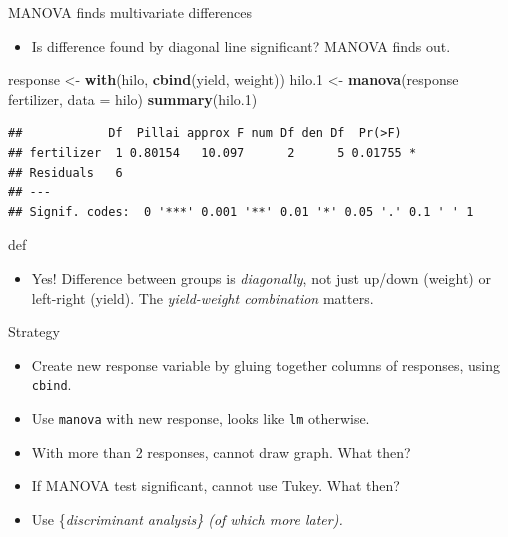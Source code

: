 \documentclass[ignorenonframetext,]{beamer}
\newenvironment{Shaded}{\begin{snugshade}}{\end{snugshade}}
\newcommand{\DataTypeTok}[1]{\textcolor[rgb]{0.13,0.29,0.53}{#1}}
\newcommand{\FloatTok}[1]{\textcolor[rgb]{0.00,0.00,0.81}{#1}}
\newcommand{\KeywordTok}[1]{\textcolor[rgb]{0.13,0.29,0.53}{\textbf{#1}}}
\newcommand{\NormalTok}[1]{#1}
\newcommand{\OperatorTok}[1]{\textcolor[rgb]{0.81,0.36,0.00}{\textbf{#1}}}
\newcommand{\StringTok}[1]{\textcolor[rgb]{0.31,0.60,0.02}{#1}}
\providecommand{\tightlist}{%
  \setlength{\itemsep}{0pt}\setlength{\parskip}{0pt}}
\begin{document}
\begin{frame}[fragile]{MANOVA finds multivariate differences}
\protect\hypertarget{manova-finds-multivariate-differences}{}

\begin{itemize}
\tightlist
\item
  Is difference found by diagonal line significant? MANOVA finds out.
\end{itemize}

\begin{Shaded}
\begin{Highlighting}[]
\NormalTok{response <-}\StringTok{ }\KeywordTok{with}\NormalTok{(hilo, }\KeywordTok{cbind}\NormalTok{(yield, weight))}
\NormalTok{hilo}\FloatTok{.1}\NormalTok{ <-}\StringTok{ }\KeywordTok{manova}\NormalTok{(response }\OperatorTok{~}\StringTok{ }\NormalTok{fertilizer, }\DataTypeTok{data =}\NormalTok{ hilo)}
\KeywordTok{summary}\NormalTok{(hilo}\FloatTok{.1}\NormalTok{)}
\end{Highlighting}
\end{Shaded}

\begin{verbatim}
##            Df  Pillai approx F num Df den Df  Pr(>F)  
## fertilizer  1 0.80154   10.097      2      5 0.01755 *
## Residuals   6                                         
## ---
## Signif. codes:  0 '***' 0.001 '**' 0.01 '*' 0.05 '.' 0.1 ' ' 1
\end{verbatim}

def

\begin{itemize}
\tightlist
\item
  Yes! Difference between groups is \emph{diagonally}, not just up/down
  (weight) or left-right (yield). The \emph{yield-weight combination}
  matters.
\end{itemize}

\end{frame}

\begin{frame}[fragile]{Strategy}
\protect\hypertarget{strategy}{}

\begin{itemize}
\item
  Create new response variable by gluing together columns of responses,
  using \texttt{cbind}.
\item
  Use \texttt{manova} with new response, looks like \texttt{lm}
  otherwise.
\item
  With more than 2 responses, cannot draw graph. What then?
\item
  If MANOVA test significant, cannot use Tukey. What then?
\item
  Use \{\em discriminant analysis\} (of which more later).
\end{itemize}

\end{frame}
\end{document}
